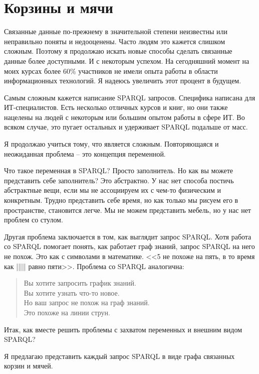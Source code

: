 \chapter{Корзины и мячи}
\label{ch:BucketsAndBalls}

Связанные данные по-прежнему в значительной степени неизвестны или неправильно поняты и недооценены. Часто людям это кажется слишком сложным. 
Поэтому я продолжаю искать новые способы сделать связанные данные более доступными. И с некоторым успехом. 
На сегодняшний момент на моих курсах более 60\% участников не имели опыта работы в области информационных технологий. Я надеюсь увеличить этот процент в будущем.

Самым сложным кажется написание SPARQL запросов. Специфика написана для ИТ-специалистов. Есть несколько отличных курсов и книг, но они также нацелены на людей с некоторым или большим опытом работы в сфере ИТ. Во всяком случае, это пугает остальных и удерживает SPARQL подальше от масс.

Я продолжаю учиться тому, что является сложным. Повторяющаяся и неожиданная проблема – это концепция переменной.

Что такое переменная в SPARQL? Просто заполнитель. Но как вы можете представить себе заполнитель? Это абстрактно. У нас нет способа постичь абстрактные вещи, если мы не ассоциируем их с чем-то физическим и конкретным. Трудно представить себе время, но как только мы рисуем его в пространстве, становится легче. Мы не можем представить мебель, но у нас нет проблем со стулом.

Другая проблема заключается в том, как выглядит запрос SPARQL. Хотя работа со SPARQL помогает понять, как работает граф знаний, запрос SPARQL на него не похож. Это как с символами в математике. <<5 не похоже на пять, в то время как ||||| равно пяти>>. Проблема со SPARQL аналогична:

\begin{quote}
Вы хотите запросить график знаний.\\
Вы хотите узнать что-то новое.\\
Но ваш запрос не похож на граф знаний.\\
Это похоже на линии струн.\\
\end{quote}

Итак, как вместе решить проблемы с захватом переменных и внешним видом SPARQL?

Я предлагаю представить каждый запрос SPARQL в виде графа связанных корзин и мячей.

